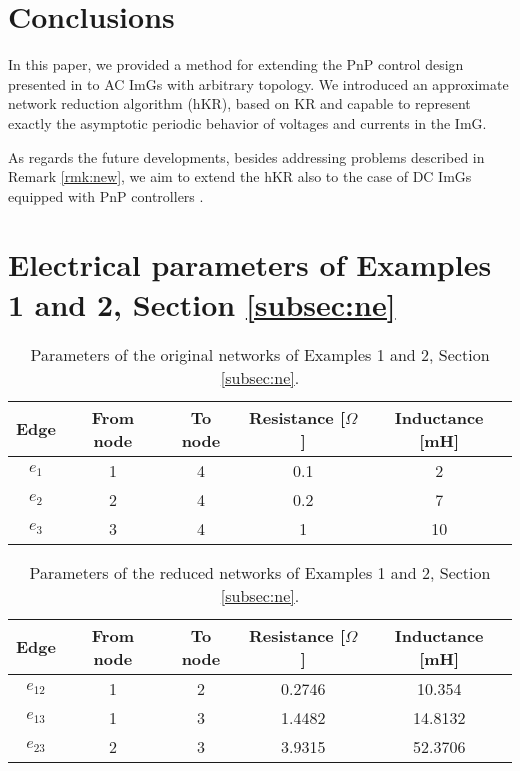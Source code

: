 \documentclass[a4paper]{article}
\theoremstyle{plain}
\begin{document}
   \section{Conclusions}
          \label{sec:conclusions}
          In this paper, we provided a method for extending the PnP control design presented in \cite{riverso2015plug} to AC ImGs with arbitrary topology. We introduced an approximate network reduction algorithm (hKR), based on KR and capable to represent exactly the asymptotic periodic behavior of voltages and currents in the ImG. 

As regards the future developments, besides addressing problems described in Remark \ref{rmk:new}, we aim to extend the hKR also to the case of DC ImGs equipped with PnP controllers \cite{tucci2015plugDC}. 

    
     \clearpage
     \appendix
     \section{Electrical parameters of Examples 1 and 2, Section \ref{subsec:ne}}
\label{app:ne}
		\begin{table}[!h]
			\centering
			\begin{tabular}{ccccc}
					\toprule

					Edge & From node & To node & Resistance [$\Omega$] & Inductance [mH] \\
					\midrule
					$e_1$ & 1 & 4 & 0.1 & 2 \\
					$e_2$ & 2 & 4 & 0.2 & 7 \\
					$e_3$ & 3 & 4 & 1 & 10 \\
					\bottomrule
			\end{tabular}
			\caption{Parameters of the original networks of Examples 1 and 2, Section \ref{subsec:ne}.}
			\label{Appendix:3FTable:OriginalParam}
		\end{table}

	\begin{table}[!h]
			\centering
			\begin{tabular}{ccccc}
				\toprule
				Edge & From node & To node & Resistance [$\Omega$] & Inductance [mH] \\
				\midrule
				$e_{12}$ & 1 & 2 & 0.2746 & 10.354 \\
				$e_{13}$ & 1 & 3 & 1.4482 & 14.8132 \\
				$e_{23}$ & 2 & 3 & 3.9315 & 52.3706 \\
				\bottomrule
			\end{tabular}
			\caption{Parameters of the reduced networks of Examples 1 and 2, Section \ref{subsec:ne}.}
			\label{Appendix:3FTable:ReducedParam}
		\end{table}
\end{document}
